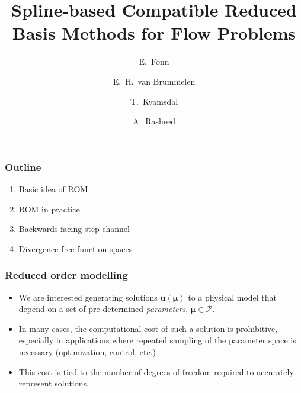 \documentclass{beamer}
\begin{document}
\title[Reduced Basis Methods]{
  Spline-based Compatible Reduced Basis Methods for Flow Problems
}
\author[E. Fonn]{
  E.~Fonn \and
  E.~H.~van Brummelen \and
  T.~Kvamsdal \and
  A.~Rasheed
}
\date[IGA 2017]{}



\begin{frame}
  \titlepage
\end{frame}

\begin{frame}
  \frametitle{Outline}
  \begin{enumerate}
  \item Basic idea of ROM
  \item ROM in practice
  \item Backwards-facing step channel
  \item Divergence-free function spaces
  \end{enumerate}
\end{frame}

\begin{frame}
  \frametitle{Reduced order modelling}
  \begin{itemize}
  \item We are interested generating solutions $\bm u(\bm \mu)$ to a physical
    model that depend on a set of pre-determined \emph{parameters},
    $\bm\mu \in \mathcal{P}$.
  \item In many cases, the computational cost of such a solution is prohibitive,
    especially in applications where repeated sampling of the parameter space is
    necessary (optimization, control, etc.)
  \item This cost is tied to the number of degrees of freedom required to
    accurately represent solutions.
  \end{itemize}
\end{frame}
\end{document}
